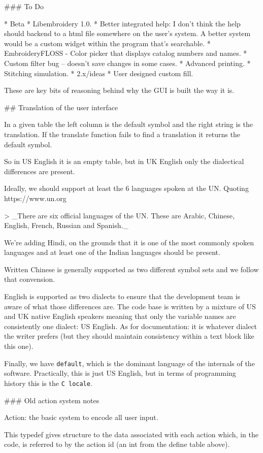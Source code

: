 ### To Do

* Beta
  * Libembroidery 1.0.
  * Better integrated help: I don't think the help should backend to a html file somewhere on the user's system. A better system would be a custom widget within the program that's searchable.
  * EmbroideryFLOSS - Color picker that displays catalog numbers and names.
  * Custom filter bug -- doesn't save changes in some cases.
  * Advanced printing.
  * Stitching simulation.
* 2.x/ideas
  * User designed custom fill.

These are key bits of reasoning behind why the GUI is built the way it is.

## Translation of the user interface

In a given table the left column is the default symbol and the right string is the translation.
If the translate function fails to find a translation it returns the default symbol.

So in US English it is an empty table, but in UK English
only the dialectical differences are present.

Ideally, we should support at least the 6 languages spoken at the UN. Quoting
https://www.un.org

> _There are six official languages of the UN. These are Arabic, Chinese, English, French, Russian and Spanish._

We're adding Hindi, on the grounds that it is one of the most commonly spoken languages and at
least one of the Indian languages should be present.

Written Chinese is generally supported as two different symbol sets and we follow that
convension.

English is supported as two dialects to ensure that the development team is aware of what those
differences are. The code base is written by a mixture of US and UK native English speakers
meaning that only the variable names are consistently one dialect: US English. As for
documentation: it is whatever dialect the writer prefers (but they should maintain consistency
within a text block like this one).

Finally, we have \texttt{default}, which is the dominant language
of the internals of the software. Practically, this is
just US English, but in terms of programming history this
is the \texttt{C locale}.

### Old action system notes

Action: the basic system to encode all user input.

This typedef gives structure to the data associated with each action
which, in the code, is referred to by the action id (an int from
the define table above).

